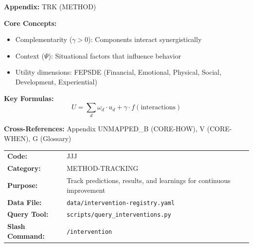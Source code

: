 \begin{tcolorbox}[colback=blue!5!white, colframe=blue!75!black,
    title=Quick Reference: Intervention Registry: Learning Loop System]

\textbf{Appendix:} TRK (METHOD)

\textbf{Core Concepts:}
\begin{itemize}[nosep]
\item Complementarity ($\gamma > 0$): Components interact synergistically
\item Context ($\Psi$): Situational factors that influence behavior
\item Utility dimensions: FEPSDE (Financial, Emotional, Physical, Social, Development, Experiential)
\end{itemize}

\textbf{Key Formulas:}
\begin{equation}
U = \sum_d \omega_d \cdot u_d + \gamma \cdot f(\text{interactions})
\end{equation}

\textbf{Cross-References:} Appendix UNMAPPED_B (CORE-HOW), V (CORE-WHEN), G (Glossary)
\end{tcolorbox}





\begin{tcolorbox}[colback=gray!5, colframe=gray!50, title=Appendix Metadata]
\begin{tabular}{ll}
\textbf{Code:} & JJJ \\
\textbf{Category:} & METHOD-TRACKING \\
\textbf{Purpose:} & Track predictions, results, and learnings for continuous improvement \\
\textbf{Data File:} & \texttt{data/intervention-registry.yaml} \\
\textbf{Query Tool:} & \texttt{scripts/query\_interventions.py} \\
\textbf{Slash Command:} & \texttt{/intervention} \\
\end{tabular}
\end{tcolorbox}

